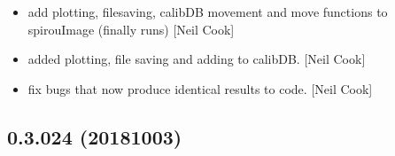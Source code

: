 \documentclass[a4paper,10pt,english]{report}
\begin{document}
\begin{itemize}
\item {} 
 \sphinxhyphen{} add plotting, filesaving, calibDB movement and
move functions to spirouImage (finally runs) {[}Neil Cook{]}

\item {} 
 \sphinxhyphen{} added plotting, file saving and adding to
calibDB. {[}Neil Cook{]}

\item {} 
 \sphinxhyphen{} fix bugs that now produce identical results to
 code. {[}Neil Cook{]}

\end{itemize}


\subsection{0.3.024 (2018\sphinxhyphen{}10\sphinxhyphen{}03)}
\end{document}
